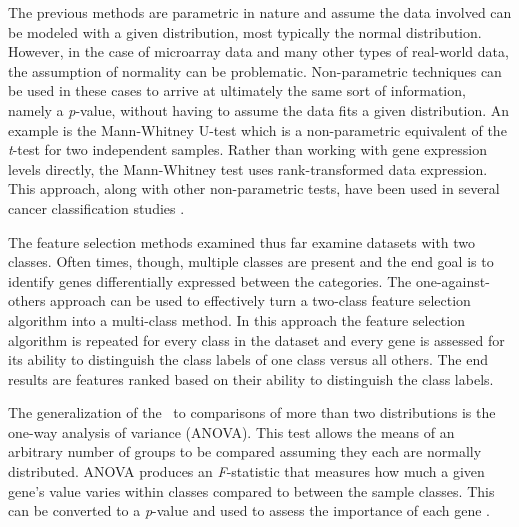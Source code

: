 {%


The previous methods are parametric in nature and assume the data involved can
be modeled with a given distribution, most typically the normal distribution.
However, in the case of microarray data and many other types of real-world
data, the assumption of normality can be problematic.  Non-parametric
techniques can be used in these cases to arrive at ultimately the same sort of
information, namely a \emph{p}-value, without having to assume the data fits a
given distribution.  An example is the Mann-Whitney U-test which is a
non-parametric equivalent of the \emph{t}-test for two independent samples.
Rather than working with gene expression levels directly, the Mann-Whitney test
uses rank-transformed data expression.  This approach, along with other
non-parametric tests, have been used in several cancer classification studies
\cite{troyanskaya2002nmi,park2001nsa,dettling2002scg}. 



The feature selection methods examined thus far examine datasets with two
classes.  Often times, though, multiple classes are present and the end goal is
to identify genes differentially expressed between the categories.  The
one-against-others approach can be used to effectively turn a two-class feature
selection algorithm into a multi-class method.  In this approach the feature
selection algorithm is repeated for every class in the dataset and every gene
is assessed for its ability to distinguish the class labels of one class versus
all others.  The end results are features ranked based on their ability to
distinguish the class labels.  


The generalization of the \ttest\ to comparisons of more than two distributions
is the one-way analysis of variance (ANOVA).  This test allows the means of an
arbitrary number of groups to be compared assuming they each are normally
distributed.  ANOVA produces an \emph{F}-statistic that measures how much a
given gene's value varies within classes compared to between the sample
classes.  This can be converted to a \emph{p}-value and used to assess the
importance of each gene \cite{cui2003std,kerr2000avg,lee2002mmg,yang2003sma}.

}
